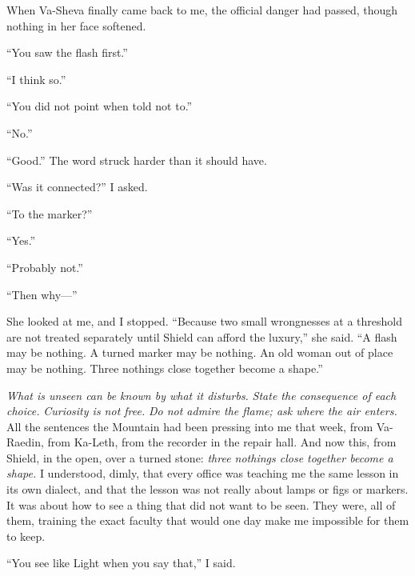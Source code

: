 \ornament

\noindent When Va-Sheva finally came back to me, the official danger had passed, though nothing in her face softened.\par

``You saw the flash first.''\par

``I think so.''\par

``You did not point when told not to.''\par

``No.''\par

``Good.'' The word struck harder than it should have.\par

``Was it connected?'' I asked.\par

``To the marker?''\par

``Yes.''\par

``Probably not.''\par

``Then why---''\par

She looked at me, and I stopped. ``Because two small wrongnesses at a threshold are not treated separately until Shield can afford the luxury,'' she said. ``A flash may be nothing. A turned marker may be nothing. An old woman out of place may be nothing. Three nothings close together become a shape.''\par

\textit{What is unseen can be known by what it disturbs.} \textit{State the consequence of each choice.} \textit{Curiosity is not free.} \textit{Do not admire the flame; ask where the air enters.} All the sentences the Mountain had been pressing into me that week, from Va-Raedin, from Ka-Leth, from the recorder in the repair hall. And now this, from Shield, in the open, over a turned stone: \textit{three nothings close together become a shape.} I understood, dimly, that every office was teaching me the same lesson in its own dialect, and that the lesson was not really about lamps or figs or markers. It was about how to see a thing that did not want to be seen. They were, all of them, training the exact faculty that would one day make me impossible for them to keep.\par

``You see like Light when you say that,'' I said.\par

